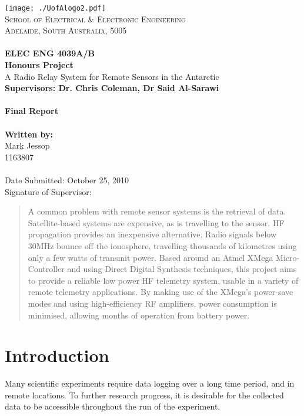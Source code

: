 \documentclass[a4paper,12pt]{article}
\begin{document}
\thispagestyle{empty}
\vspace*{\fill}
\texttt{[image: ./UofAlogo2.pdf]}\\
\noindent
\textsc{
\textsc{School of Electrical \& Electronic Engineering}\\
Adelaide, South Australia, 5005\\ \\
}
\noindent
\Large{\textbf{
ELEC ENG 4039A/B \\
Honours Project\\
	}}
	\Large{
		A Radio Relay System for Remote Sensors in the Antarctic \\
	}
	\small{\textbf{Supervisors: Dr. Chris Coleman, Dr Said Al-Sarawi}}
	\ \\
	\ \\
	\Large{\textbf{
		Final Report \\
	}}
	\ \\
	\small{\textbf{
		Written by: \\}
		Mark Jessop \\
		1163807
	}
	\ \\
	\ \\
	Date Submitted: October 25, 2010 \\
	Signature of Supervisor: \\
 \vspace*{\fill}

\newpage
 \thispagestyle{empty}
 \vspace*{\fill}
\begin{abstract}
\noindent
A common problem with remote sensor systems is the retrieval of data. Satellite-based systems are expensive, as is travelling to the sensor. HF propagation provides an inexpensive alternative. Radio signals below 30MHz bounce off the ionosphere, travelling thousands of kilometres using only a few watts of transmit power.
Based around an Atmel XMega Micro-Controller and using Direct Digital Synthesis techniques, this project aims to provide a reliable low power HF telemetry system, usable in a variety of remote telemetry applications. 
By making use of the XMega's power-save modes and using high-efficiency RF amplifiers, power consumption is minimised, allowing months of operation from battery power.
\end{abstract}
\vspace*{\fill}
\newpage
\setcounter{tocdepth}{2}
\tableofcontents
\newpage

\section{Introduction}
Many scientific experiments require data logging over a long time period, and in remote locations. To further research progress, it is desirable for the collected data to be accessible throughout the run of the experiment.
\end{document}
